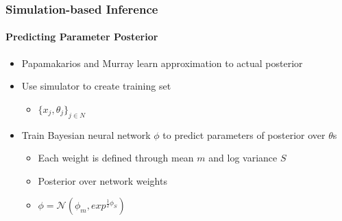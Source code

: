 \documentclass[9pt, aspectratio=169]{beamer}
\begin{document}
\begin{frame}
\frametitle{Simulation-based Inference}
\framesubtitle{Predicting Parameter Posterior}
\begin{itemize}
	\item Papamakarios and Murray \cite{papamakarios2016fast} learn approximation to actual posterior
	\item Use simulator to create training set
	\begin{itemize}
		\item $\lbrace x_j, \theta_j \rbrace_{j \in N}$
	\end{itemize}
	\item Train Bayesian neural network $\phi$ to predict parameters of posterior over $\theta$s
	\begin{itemize}
		\item Each weight is defined through mean $m$ and log variance $S$
		\item Posterior over network weights %
		\item $\phi = \mathcal{N}(\phi_m, exp^{\frac{1}{2}\phi_S})$ %
	\end{itemize} 
\end{itemize}
\end{frame} 
\end{document}
